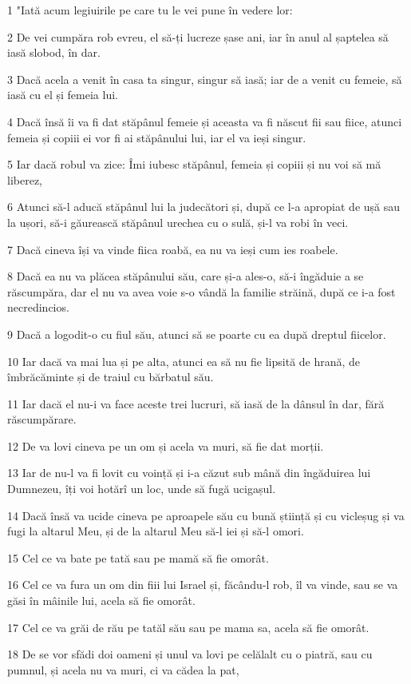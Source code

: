 \par 1 "Iată acum legiuirile pe care tu le vei pune în vedere lor:
\par 2 De vei cumpăra rob evreu, el să-ți lucreze șase ani, iar în anul al șaptelea să iasă slobod, în dar.
\par 3 Dacă acela a venit în casa ta singur, singur să iasă; iar de a venit cu femeie, să iasă cu el și femeia lui.
\par 4 Dacă însă îi va fi dat stăpânul femeie și aceasta va fi născut fii sau fiice, atunci femeia și copiii ei vor fi ai stăpânului lui, iar el va ieși singur.
\par 5 Iar dacă robul va zice: Îmi iubesc stăpânul, femeia și copiii și nu voi să mă liberez,
\par 6 Atunci să-l aducă stăpânul lui la judecători și, după ce l-a apropiat de ușă sau la ușori, să-i găurească stăpânul urechea cu o sulă, și-l va robi în veci.
\par 7 Dacă cineva își va vinde fiica roabă, ea nu va ieși cum ies roabele.
\par 8 Dacă ea nu va plăcea stăpânului său, care și-a ales-o, să-i îngăduie a se răscumpăra, dar el nu va avea voie s-o vândă la familie străină, după ce i-a fost necredincios.
\par 9 Dacă a logodit-o cu fiul său, atunci să se poarte cu ea după dreptul fiicelor.
\par 10 Iar dacă va mai lua și pe alta, atunci ea să nu fie lipsită de hrană, de îmbrăcăminte și de traiul cu bărbatul său.
\par 11 Iar dacă el nu-i va face aceste trei lucruri, să iasă de la dânsul în dar, fără răscumpărare.
\par 12 De va lovi cineva pe un om și acela va muri, să fie dat morții.
\par 13 Iar de nu-l va fi lovit cu voință și i-a căzut sub mână din îngăduirea lui Dumnezeu, îți voi hotărî un loc, unde să fugă ucigașul.
\par 14 Dacă însă va ucide cineva pe aproapele său cu bună știință și cu vicleșug și va fugi la altarul Meu, și de la altarul Meu să-l iei și să-l omori.
\par 15 Cel ce va bate pe tată sau pe mamă să fie omorât.
\par 16 Cel ce va fura un om din fiii lui Israel și, făcându-l rob, îl va vinde, sau se va găsi în mâinile lui, acela să fie omorât.
\par 17 Cel ce va grăi de rău pe tatăl său sau pe mama sa, acela să fie omorât.
\par 18 De se vor sfădi doi oameni și unul va lovi pe celălalt cu o piatră, sau cu pumnul, și acela nu va muri, ci va cădea la pat,
